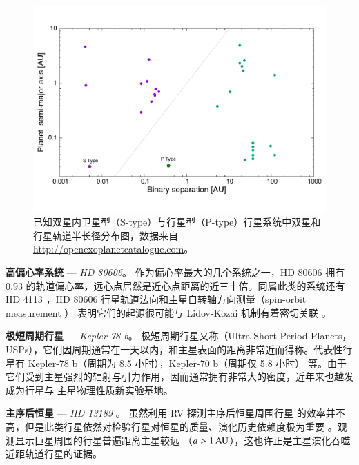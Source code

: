 \begin{figure}[t]
\centering
\includegraphics[width=1.0\textwidth]{figures/chapter1/fig13_binaryplanet.pdf}
\caption{已知双星内卫星型（S-type）与行星型（P-type）行星系统中双星和行星轨道半长径分布图，数据来自 \url{http://openexoplanetcatalogue.com}。}
\label{fig:pibinary}
\end{figure}

\textbf{高偏心率系统} --- \textit{HD 80606}。  {}  作为偏心率最大的几个系统之一，HD 80606 拥有 0.93 
的轨道偏心率\cite{Naef2001}，远心点居然是近心点距离的近三十倍。同属此类的系统还有 HD 4113
\cite{Tamuz2008}，HD 80606 行星轨道法向和主星自转轴方向测量（spin-orbit measurement ）
\cite{Pont2009}表明它们的起源很可能与 Lidov-Kozai 机制\cite{Lidov1962,Kozai1962}有着密切关联
\cite{Wu2003}。

\textbf{极短周期行星} --- \textit{Kepler-78 b}。  {}  极短周期行星又称（Ultra Short Period Planets，
USPs），它们因周期通常在一天以内，和主星表面的距离非常近而得称。代表性行星有 Kepler-78 
b（周期为 8.5 小时\cite{SanchisOjeda2013}），Kepler-70 b（周期仅 5.8 小时\cite{Charpinet2011}）
等。由于它们受到主星强烈的辐射与引力作用，因而通常拥有非常大的密度，近年来也越发成为行星与
主星物理性质新实验基地\cite{Lopez2016,Moutou2016}。

\textbf{主序后恒星} --- \textit{HD 13189}\cite{Hatzes2005} 。 {}  虽然利用 RV 探测主序后恒星周围行星
的效率并不高\cite{Sato2005}，但是此类行星依然对检验行星对恒星的质量、演化历史依赖度极为重要
\cite{Kennedy2008,Johnson2007b,Jones2014}。观测显示巨星周围的行星普遍距离主星较远
（$a > 1\,\mathrm{AU}$），这也许正是主星演化吞噬近距轨道行星的证据\cite{Johnson2007a,Bowler2010}。

